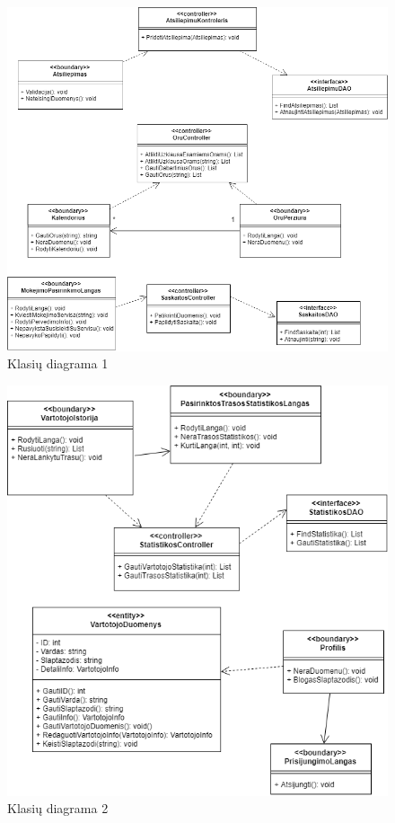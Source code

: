 \documentclass[oneside]{VUMIFPSkursinis}
\begin{document}
			\begin{figure}[h]
    				\centering
    				\includegraphics[width=1\textwidth]{classA.png}
    				\caption{Klasių diagrama 1}
    				\label{fig:KlasiuDiagrama}
			\end{figure}
			\begin{figure}[h]
    				\centering
    				\includegraphics[width=1\textwidth]{classB.png}
    				\caption{Klasių diagrama 2}
    				\label{fig:KlasiuDiagrama}
			\end{figure}
\end{document}
